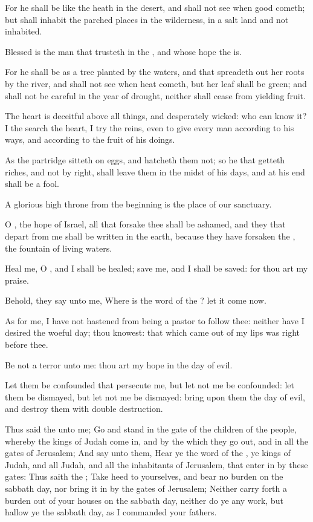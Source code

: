 \Verse For he shall be like the heath in the desert, and shall not see when good cometh; but shall inhabit the parched places in the wilderness, in a salt land and not inhabited.

\Verse Blessed is the man that trusteth in the \LORD, and whose hope the \LORD is.

\Verse For he shall be as a tree planted by the waters, and that spreadeth out her roots by the river, and shall not see when heat cometh, but her leaf shall be green; and shall not be careful in the year of drought, neither shall cease from yielding fruit.

\Verse The heart is deceitful above all things, and desperately wicked: who can know it?  \Verse I the \LORD search the heart, I try the reins, even to give every man according to his ways, and according to the fruit of his doings.

\Verse As the partridge sitteth on eggs, and hatcheth them not; so he that getteth riches, and not by right, shall leave them in the midst of his days, and at his end shall be a fool.

\Verse A glorious high throne from the beginning is the place of our sanctuary.

\Verse O \LORD, the hope of Israel, all that forsake thee shall be ashamed, and they that depart from me shall be written in the earth, because they have forsaken the \LORD, the fountain of living waters.

\Verse Heal me, O \LORD, and I shall be healed; save me, and I shall be saved: for thou art my praise.

\Verse Behold, they say unto me, Where is the word of the \LORD? let it come now.

\Verse As for me, I have not hastened from being a pastor to follow thee: neither have I desired the woeful day; thou knowest: that which came out of my lips was right before thee.

\Verse Be not a terror unto me: thou art my hope in the day of evil.

\Verse Let them be confounded that persecute me, but let not me be confounded: let them be dismayed, but let not me be dismayed: bring upon them the day of evil, and destroy them with double destruction.

\Verse Thus said the \LORD unto me; Go and stand in the gate of the children of the people, whereby the kings of Judah come in, and by the which they go out, and in all the gates of Jerusalem; \Verse And say unto them, Hear ye the word of the \LORD, ye kings of Judah, and all Judah, and all the inhabitants of Jerusalem, that enter in by these gates: \Verse Thus saith the \LORD; Take heed to yourselves, and bear no burden on the sabbath day, nor bring it in by the gates of Jerusalem; \Verse Neither carry forth a burden out of your houses on the sabbath day, neither do ye any work, but hallow ye the sabbath day, as I commanded your fathers.

